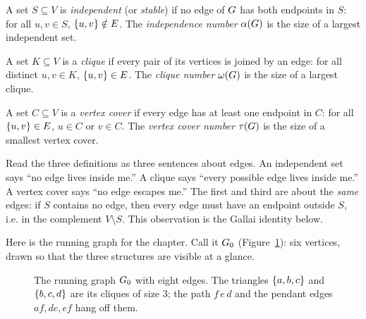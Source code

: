 \begin{definition}
\label{ch29:def-is}
A set $S\subseteq V$ is \emph{independent} (or \emph{stable}) if no edge of
$G$ has both endpoints in $S$: for all $u,v\in S$, $\{u,v\}\notin E$. The
\emph{independence number} $\alpha(G)$ is the size of a largest independent
set.
\end{definition}

\begin{definition}[Clique]
\label{ch29:def-clique}
A set $K\subseteq V$ is a \emph{clique} if every pair of its vertices is joined
by an edge: for all distinct $u,v\in K$, $\{u,v\}\in E$. The \emph{clique
number} $\omega(G)$ is the size of a largest clique.
\end{definition}

\begin{definition}
\label{ch29:def-vc}
A set $C\subseteq V$ is a \emph{vertex cover} if every edge has at least one
endpoint in $C$: for all $\{u,v\}\in E$, $u\in C$ or $v\in C$. The \emph{vertex
cover number} $\tau(G)$ is the size of a smallest vertex cover.
\end{definition}

\begin{intuitionbox}
Read the three definitions as three sentences about edges. An independent set
says ``no edge lives inside me.'' A clique says ``every possible edge lives
inside me.'' A vertex cover says ``no edge escapes me.'' The first and third are
about the \emph{same} edges: if $S$ contains no edge, then every edge must have
an endpoint outside $S$, i.e. in the complement $V\setminus S$. This observation
is the Gallai identity below.
\end{intuitionbox}

Here is the running graph for the chapter. Call it $G_0$
(Figure~\ref{ch29:fig-g0}): six vertices, drawn so that the three structures are
visible at a glance.

\begin{figure}[H]
\centering
{}
\caption{The running graph $G_0$ with eight edges. The triangles $\{a,b,c\}$
and $\{b,c,d\}$ are its cliques of size $3$; the path $f\,e\,d$ and the pendant
edges $af,de,ef$ hang off them.}
\label{ch29:fig-g0}
\end{figure}

